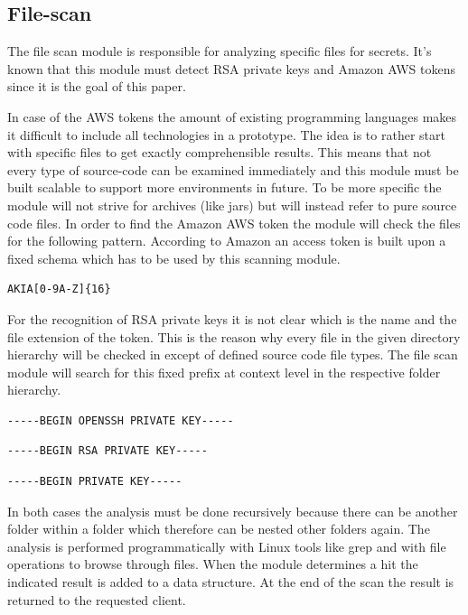 \subsection{File-scan}
\label{ch:theory:analysing_process:scan}
The file scan module is responsible for analyzing specific files for secrets. It's known that this module must detect RSA private keys and Amazon AWS tokens since it is the goal of this paper.

In case of the AWS tokens the amount of existing programming languages makes it difficult to include all technologies in a prototype. The idea is to rather start with specific files to get exactly comprehensible results. This means that not every type of source-code can be examined immediately and this module must be built scalable to support more environments in future.
To be more specific the module will not strive for archives (like jars) but will instead refer to pure source code files.
In order to find the Amazon AWS token the module will check the files for the following pattern.
According to Amazon an access token is built upon a fixed schema which has to be used by this scanning module.
\begin{lstlisting}
AKIA[0-9A-Z]{16}
\end{lstlisting}

For the recognition of RSA private keys it is not clear which is the name and the file extension of the token. This is the reason why every file in the given directory hierarchy will be checked in except of defined source code file types.
The file scan module will search for this fixed prefix at context level in the respective folder hierarchy.
\begin{lstlisting}
-----BEGIN OPENSSH PRIVATE KEY-----
\end{lstlisting}
\begin{lstlisting}
-----BEGIN RSA PRIVATE KEY-----
\end{lstlisting}
\begin{lstlisting}
-----BEGIN PRIVATE KEY-----
\end{lstlisting}

In both cases the analysis must be done recursively because there can be another folder within a folder which therefore can be nested other folders again.
The analysis is performed programmatically with Linux tools like grep and with file operations to browse through files.
When the module determines a hit the indicated result is added to a data structure. At the end of the scan the result is returned to the requested client.


